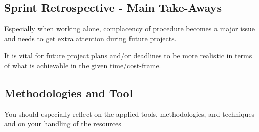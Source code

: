 \subsection{Sprint Retrospective - Main Take-Aways}
Especially when working alone, complacency of procedure becomes a major issue and needs to get extra attention during future projects.

It is vital for future project plans and/or deadlines to be more realistic in terms of what is achievable in the given time/cost-frame.

\subsection{Methodologies and Tool}
You should especially reflect on the applied tools, methodologies, and techniques and on your handling of the resources